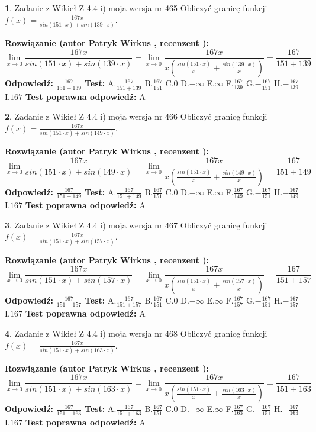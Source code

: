 \documentclass[12pt, a4paper]{article}
\theoremstyle{definition} %
\newtheorem{zad}{}
\newcommand{\zadStart}[1]{\begin{zad}#1\newline}
\newcommand{\zadStop}{\end{zad}}
\newcommand{\rozwStart}[2]{\noindent \textbf{Rozwiązanie (autor #1 , recenzent #2): }\newline}
\newcommand{\rozwStop}{\newline}
\newcommand{\odpStart}{\noindent \textbf{Odpowiedź:}\newline}
\newcommand{\odpStop}{\newline}
\newcommand{\testStart}{\noindent \textbf{Test:}\newline}
\newcommand{\testStop}{\newline}
\newcommand{\kluczStart}{\noindent \textbf{Test poprawna odpowiedź:}\newline}
\newcommand{\kluczStop}{\newline}
\begin{document}
\zadStart{Zadanie z Wikieł Z 4.4 i) moja wersja nr 465}
Obliczyć granicę funkcji $f(x)=\frac{167x}{sin(151\cdot x) +sin(139\cdot x)}$.
\zadStop
\rozwStart{Patryk Wirkus}{}
$$\lim\limits_{x\to 0}\frac{167x}{sin(151\cdot x) +sin(139\cdot x)}=\lim\limits_{x\to 0}\frac{167x}{x(\frac{sin(151\cdot x)}{x}+\frac{sin(139\cdot x)}{x})}=\frac{167}{151+139}$$
\rozwStop
\odpStart
$\frac{167}{151+139}$
\odpStop
\testStart
A.$\frac{167}{151+139}$
B.$\frac{167}{151}$
C.$0$
D.$-\infty$
E.$\infty$
F.$\frac{167}{139}$
G.$-\frac{167}{151}$
H.$-\frac{167}{139}$
I.$167$
\testStop
\kluczStart
A
\kluczStop



\zadStart{Zadanie z Wikieł Z 4.4 i) moja wersja nr 466}
Obliczyć granicę funkcji $f(x)=\frac{167x}{sin(151\cdot x) +sin(149\cdot x)}$.
\zadStop
\rozwStart{Patryk Wirkus}{}
$$\lim\limits_{x\to 0}\frac{167x}{sin(151\cdot x) +sin(149\cdot x)}=\lim\limits_{x\to 0}\frac{167x}{x(\frac{sin(151\cdot x)}{x}+\frac{sin(149\cdot x)}{x})}=\frac{167}{151+149}$$
\rozwStop
\odpStart
$\frac{167}{151+149}$
\odpStop
\testStart
A.$\frac{167}{151+149}$
B.$\frac{167}{151}$
C.$0$
D.$-\infty$
E.$\infty$
F.$\frac{167}{149}$
G.$-\frac{167}{151}$
H.$-\frac{167}{149}$
I.$167$
\testStop
\kluczStart
A
\kluczStop



\zadStart{Zadanie z Wikieł Z 4.4 i) moja wersja nr 467}
Obliczyć granicę funkcji $f(x)=\frac{167x}{sin(151\cdot x) +sin(157\cdot x)}$.
\zadStop
\rozwStart{Patryk Wirkus}{}
$$\lim\limits_{x\to 0}\frac{167x}{sin(151\cdot x) +sin(157\cdot x)}=\lim\limits_{x\to 0}\frac{167x}{x(\frac{sin(151\cdot x)}{x}+\frac{sin(157\cdot x)}{x})}=\frac{167}{151+157}$$
\rozwStop
\odpStart
$\frac{167}{151+157}$
\odpStop
\testStart
A.$\frac{167}{151+157}$
B.$\frac{167}{151}$
C.$0$
D.$-\infty$
E.$\infty$
F.$\frac{167}{157}$
G.$-\frac{167}{151}$
H.$-\frac{167}{157}$
I.$167$
\testStop
\kluczStart
A
\kluczStop



\zadStart{Zadanie z Wikieł Z 4.4 i) moja wersja nr 468}
Obliczyć granicę funkcji $f(x)=\frac{167x}{sin(151\cdot x) +sin(163\cdot x)}$.
\zadStop
\rozwStart{Patryk Wirkus}{}
$$\lim\limits_{x\to 0}\frac{167x}{sin(151\cdot x) +sin(163\cdot x)}=\lim\limits_{x\to 0}\frac{167x}{x(\frac{sin(151\cdot x)}{x}+\frac{sin(163\cdot x)}{x})}=\frac{167}{151+163}$$
\rozwStop
\odpStart
$\frac{167}{151+163}$
\odpStop
\testStart
A.$\frac{167}{151+163}$
B.$\frac{167}{151}$
C.$0$
D.$-\infty$
E.$\infty$
F.$\frac{167}{163}$
G.$-\frac{167}{151}$
H.$-\frac{167}{163}$
I.$167$
\testStop
\kluczStart
A
\kluczStop
\end{document}
